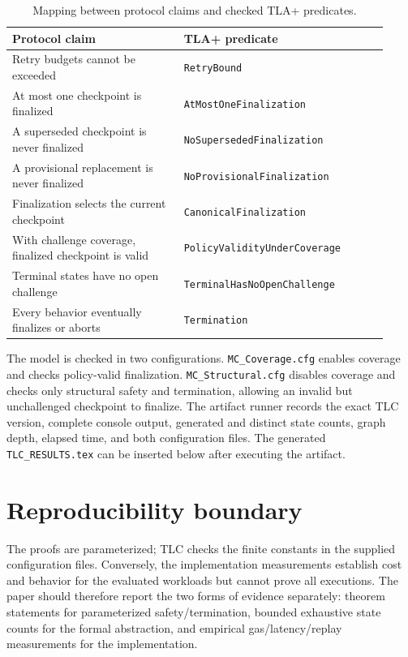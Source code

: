 \documentclass[10pt]{article}
\begin{document}
\begin{table}[h]
\centering
\caption{Mapping between protocol claims and checked TLA+ predicates.}
\begin{tabular}{@{}p{0.42\linewidth}p{0.50\linewidth}@{}}
\toprule
Protocol claim & TLA+ predicate \\
\midrule
Retry budgets cannot be exceeded & \texttt{RetryBound} \\
At most one checkpoint is finalized & \texttt{AtMostOneFinalization} \\
A superseded checkpoint is never finalized & \texttt{NoSupersededFinalization} \\
A provisional replacement is never finalized & \texttt{NoProvisionalFinalization} \\
Finalization selects the current checkpoint & \texttt{CanonicalFinalization} \\
With challenge coverage, finalized checkpoint is valid & \texttt{PolicyValidityUnderCoverage} \\
Terminal states have no open challenge & \texttt{TerminalHasNoOpenChallenge} \\
Every behavior eventually finalizes or aborts & \texttt{Termination} \\
\bottomrule
\end{tabular}
\end{table}

The model is checked in two configurations.  \texttt{MC\_Coverage.cfg} enables
coverage and checks policy-valid finalization.  \texttt{MC\_Structural.cfg}
disables coverage and checks only structural safety and termination, allowing an
invalid but unchallenged checkpoint to finalize.  The artifact runner records
the exact TLC version, complete console output, generated and distinct state
counts, graph depth, elapsed time, and both configuration files.  The generated
\texttt{TLC\_RESULTS.tex} can be inserted below after executing the artifact.


\section{Reproducibility boundary}
The proofs are parameterized; TLC checks the finite constants in the supplied
configuration files.  Conversely, the implementation measurements establish
cost and behavior for the evaluated workloads but cannot prove all executions.
The paper should therefore report the two forms of evidence separately: theorem
statements for parameterized safety/termination, bounded exhaustive state counts
for the formal abstraction, and empirical gas/latency/replay measurements for
the implementation.
\end{document}
